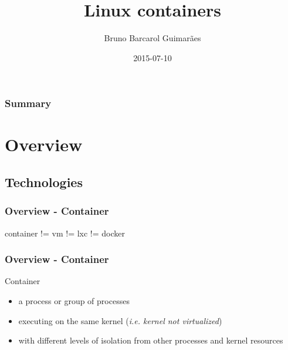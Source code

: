 \documentclass{beamer}
\title[Linux containers]{Linux containers}
\author{Bruno Barcarol Guimarães}
\institute[]{\textit{bbgstb@gmail.com}}
\date{2015-07-10}
\begin{document}
\begin{frame}
    \titlepage
\end{frame}

\begin{frame}
    \frametitle{Summary}
    \tableofcontents
\end{frame}

\section{Overview}

\subsection{Technologies}

\begin{frame}
    \frametitle{Overview - Container}
    container != vm != lxc != docker
\end{frame}

\begin{frame}
    \frametitle{Overview - Container}
    Container
    \begin{itemize}
        \item a process or group of processes
        \item
            executing on the same kernel (\textit{i.e. kernel not virtualized})
        \item
            with different levels of isolation from other processes and kernel
            resources
    \end{itemize}
\end{frame}
\end{document}
